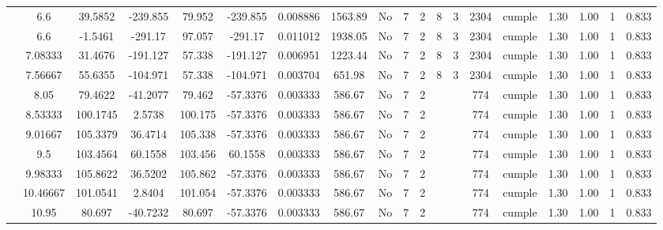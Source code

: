 \begin{table}[H]
{\begin{tabular}{|c|c|c|c|c|c|r|c|c|c|c|c|c|c|c|c|c|c|c|}
\cline{2-19}        & \cellcolor[rgb]{ .851,  .882,  .949}6.6 & 39.5852 & -239.855 & 79.952 & -239.855 & 0.008886 & 1563.89 & No  & 7   & 2   & 8   & 3   & 2304 & \cellcolor[rgb]{ .776,  .937,  .808}cumple & 1.30 & 1.00 & 1   & 0.833 \bigstrut\\
\cline{2-19}        & \cellcolor[rgb]{ .851,  .882,  .949}6.6 & -1.5461 & -291.17 & 97.057 & -291.17 & 0.011012 & 1938.05 & No  & 7   & 2   & 8   & 3   & 2304 & \cellcolor[rgb]{ .776,  .937,  .808}cumple & 1.30 & 1.00 & 1   & 0.833 \bigstrut\\
\cline{2-19}        & 7.08333 & 31.4676 & -191.127 & 57.338 & -191.127 & 0.006951 & 1223.44 & No  & 7   & 2   & 8   & 3   & 2304 & \cellcolor[rgb]{ .776,  .937,  .808}cumple & 1.30 & 1.00 & 1   & 0.833 \bigstrut\\
\cline{2-19}        & 7.56667 & 55.6355 & -104.971 & 57.338 & -104.971 & 0.003704 & 651.98 & No  & 7   & 2   & 8   & 3   & 2304 & \cellcolor[rgb]{ .776,  .937,  .808}cumple & 1.30 & 1.00 & 1   & 0.833 \bigstrut\\
\cline{2-19}        & 8.05 & 79.4622 & -41.2077 & 79.462 & -57.3376 & 0.003333 & 586.67 & No  & 7   & 2   &     &     & 774 & \cellcolor[rgb]{ .776,  .937,  .808}cumple & 1.30 & 1.00 & 1   & 0.833 \bigstrut\\
\cline{2-19}        & 8.53333 & 100.1745 & 2.5738 & 100.175 & -57.3376 & 0.003333 & 586.67 & No  & 7   & 2   &     &     & 774 & \cellcolor[rgb]{ .776,  .937,  .808}cumple & 1.30 & 1.00 & 1   & 0.833 \bigstrut\\
\cline{2-19}        & 9.01667 & 105.3379 & 36.4714 & 105.338 & -57.3376 & 0.003333 & 586.67 & No  & 7   & 2   &     &     & 774 & \cellcolor[rgb]{ .776,  .937,  .808}cumple & 1.30 & 1.00 & 1   & 0.833 \bigstrut\\
\cline{2-19}        & 9.5 & 103.4564 & 60.1558 & 103.456 & 60.1558 & 0.003333 & 586.67 & No  & 7   & 2   &     &     & 774 & \cellcolor[rgb]{ .776,  .937,  .808}cumple & 1.30 & 1.00 & 1   & 0.833 \bigstrut\\
\cline{2-19}        & 9.98333 & 105.8622 & 36.5202 & 105.862 & -57.3376 & 0.003333 & 586.67 & No  & 7   & 2   &     &     & 774 & \cellcolor[rgb]{ .776,  .937,  .808}cumple & 1.30 & 1.00 & 1   & 0.833 \bigstrut\\
\cline{2-19}        & 10.46667 & 101.0541 & 2.8404 & 101.054 & -57.3376 & 0.003333 & 586.67 & No  & 7   & 2   &     &     & 774 & \cellcolor[rgb]{ .776,  .937,  .808}cumple & 1.30 & 1.00 & 1   & 0.833 \bigstrut\\
\cline{2-19}        & 10.95 & 80.697 & -40.7232 & 80.697 & -57.3376 & 0.003333 & 586.67 & No  & 7   & 2   &     &     & 774 & \cellcolor[rgb]{ .776,  .937,  .808}cumple & 1.30 & 1.00 & 1   & 0.833 \bigstrut\\

\end{tabular}}
\end{table}
